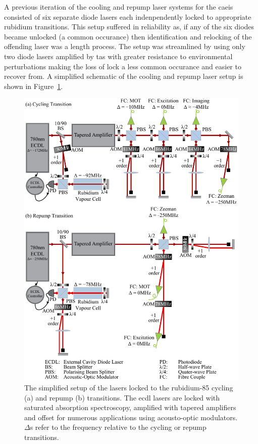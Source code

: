 A previous iteration of the cooling and repump laser systems for the \gls{caeis} consisted of six separate diode lasers each indenpendently locked to appropriate rubidium transitions.
This setup suffered in reliability as, if any of the six diodes became unlocked (a common occurance) then identification and relocking of the offending laser was a length process.
The setup was streamlined by using only two diode lasers amplified by \glspl{ta} with greater resistance to environmental perturbations making the loss of lock a less common occurance and easier to recover from.
A simplified schematic of the cooling and repump laser setup is shown in Figure~\ref{figure:laser_setup}.

\begin{figure}
    \center
    \includegraphics{part2/Figs/laser_setup.pdf}
    \caption{The simplified setup of the lasers locked to the rubidium-85 cycling (a) and repump (b) transitions.
    The \gls{ecdl} lasers are locked with saturated absorption spectroscopy, amplified with tapered amplifiers and offset for numerous applications using acousto-optic modulators.
    $\Delta$s refer to the frequency relative to the cycling or repump transitions.}
    \label{figure:laser_setup}
\end{figure}

